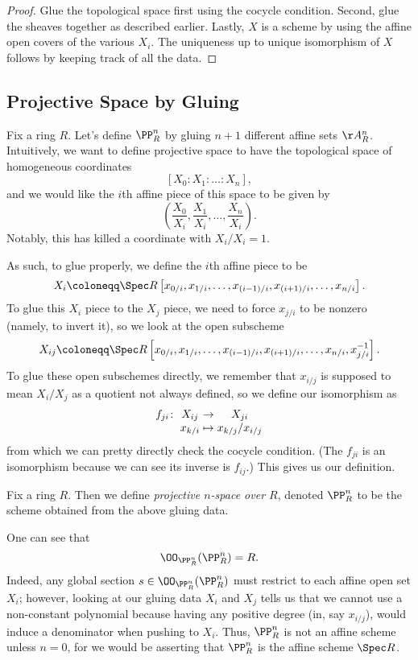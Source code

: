 \documentclass[../notes.tex]{subfiles}
\begin{document}
\begin{proof}
	Glue the topological space first using the cocycle condition. Second, glue the sheaves together as described earlier. Lastly, $X$ is a scheme by using the affine open covers of the various $X_i$. The uniqueness up to unique isomorphism of $X$ follows by keeping track of all the data.
\end{proof}

\subsection{Projective Space by Gluing}
Fix a ring $R$. Let's define $\PP_R^n$ by gluing $n+1$ different affine sets $\AA^n_R$. Intuitively, we want to define projective space to have the topological space of homogeneous coordinates
\[[X_0:X_1:\ldots:X_n],\]
and we would like the $i$th affine piece of this space to be given by
\[\left(\frac{X_0}{X_i},\frac{X_1}{X_i},\ldots,\frac{X_n}{X_i}\right).\]
Notably, this has killed a coordinate with $X_i/X_i=1$.

As such, to glue properly, we define the $i$th affine piece to be
\[X_i\coloneqq\Spec R\left[x_{0/i},x_{1/i},\ldots,x_{(i-1)/i},x_{(i+1)/i},\ldots,x_{n/i}\right].\]
To glue this $X_i$ piece to the $X_j$ piece, we need to force $x_{j/i}$ to be nonzero (namely, to invert it), so we look at the open subscheme
\[X_{ij}\coloneqq\Spec R\left[x_{0/i},x_{1/i},\ldots,x_{(i-1)/i},x_{(i+1)/i},\ldots,x_{n/i},x_{j/i}^{-1}\right].\]
To glue these open subschemes directly, we remember that $x_{i/j}$ is supposed to mean $X_i/X_j$ as a quotient not always defined, so we define our isomorphism as
\[\arraycolsep=1.4pt\begin{array}{cccc}
	f_{ji}\colon& X_{ij} &\to& X_{ji} \\
	& x_{k/i} &\mapsto& x_{k/j}/x_{i/j}
\end{array}\]
from which we can pretty directly check the cocycle condition. (The $f_{ji}$ is an isomorphism because we can see its inverse is $f_{ij}$.) This gives us our definition.
\begin{definition}
	Fix a ring $R$. Then we define \textit{projective $n$-space over $R$}, denoted $\PP^n_R$ to be the scheme obtained from the above gluing data.
\end{definition}
\begin{remark}
	One can see that
	\[\OO_{\PP^n_R}(\PP^n_R)=R.\]
	Indeed, any global section $s\in\OO_{\PP^n_R}(\PP^n_R)$ must restrict to each affine open set $X_i$; however, looking at our gluing data $X_i$ and $X_j$ tells us that we cannot use a non-constant polynomial because having any positive degree (in, say $x_{i/j}$), would induce a denominator when pushing to $X_i$. Thus, $\PP^n_R$ is not an affine scheme unless $n=0$, for we would be asserting that $\PP^n_R$ is the affine scheme $\Spec R$.
\end{remark}
\end{document}
